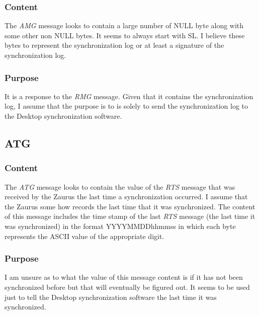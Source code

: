             \subsubsection{Content}

            The \emph{AMG} message looks to contain a large number of NULL
            byte along with some other non NULL bytes. It seems to always
            start with SL. I believe these bytes to represent the
            synchronization log or at least a signature of the synchronization
            log.

            \subsubsection{Purpose}

            It is a response to the \emph{RMG} message. Given that it contains
            the synchronization log, I assume that the purpose is to is solely
            to send the synchronization log to the Desktop synchronization
            software.

        \subsection{ATG}

            \subsubsection{Content}

            The \emph{ATG} message looks to contain the value of the
            \emph{RTS} message that was received by the Zaurus the last time a
            synchronization occurred. I assume that the Zaurus some how records
            the last time that it was synchronized. The content of this message
            includes the time stamp of the last \emph{RTS} message (the last
            time it was synchronized) in the format YYYYMMDDhhmmss in which
            each byte represents the ASCII value of the appropriate digit.

            \subsubsection{Purpose}

            I am unsure as to what the value of this message content is if it
            has not been synchronized before but that will eventually be
            figured out. It seems to be used just to tell the Desktop
            synchronization software the last time it was synchronized.

